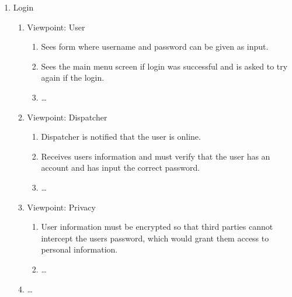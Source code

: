 \documentclass[english]{article}
\begin{document}
\begin{enumerate}[{BE}1.]
	\item Login
	\begin{enumerate}[{VP1}.1]
		\item Viewpoint: User
			\begin{enumerate}
				\item Sees form where username and password can be given as input.
				\item Sees the main menu screen if login was successful and is asked to try again if the login.
				\item \dots
			\end{enumerate}
		\item Viewpoint: Dispatcher
			\begin{enumerate}
				\item Dispatcher is notified that the user is online.
				\item Receives users information and must verify that the user has an account and has input the correct password.
				\item \dots
			\end{enumerate}
		\item Viewpoint: Privacy
			\begin{enumerate}
				\item User information must be encrypted so that third parties cannot intercept the users password, which would grant them access to personal information.
				\item \dots
			\end{enumerate}
		\item \dots
	\end{enumerate}
		

\end{enumerate}
\end{document}
